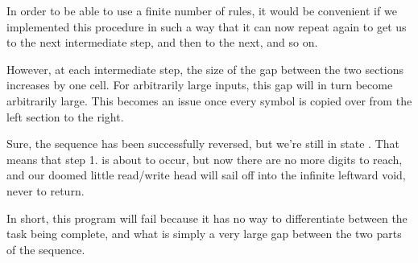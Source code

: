 In order to be able to use a finite number of rules, it would be convenient if we implemented this procedure in such a way that it can now repeat again to get us to the next intermediate step, and then to the next, and so on.

However, at each intermediate step, the size of the gap between the two sections increases by one cell. For arbitrarily large inputs, this gap will in turn become arbitrarily large. This becomes an issue once every symbol is copied over from the left section to the right.

\begin{center}
\end{center}

Sure, the sequence has been successfully reversed, but we're still in state . That means that step 1. is about to occur, but now there are no more digits to reach, and our doomed little read/write head will sail off into the infinite leftward void, never to return.

In short, this program will fail because it has no way to differentiate between the task being complete, and what is simply a very large gap between the two parts of the sequence.

